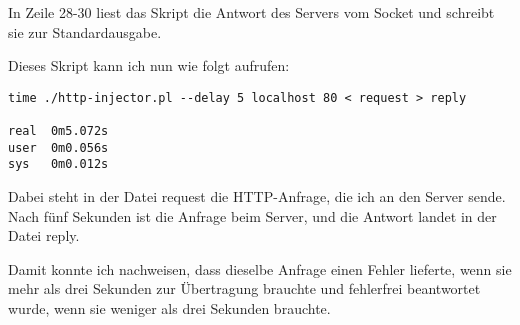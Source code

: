 \begin{normaltext}
  In Zeile 28-30 liest das Skript die Antwort des Servers vom Socket und
  schreibt sie zur Standardausgabe.

  Dieses Skript kann ich nun wie folgt aufrufen:
  \begin{verbatim}
time ./http-injector.pl --delay 5 localhost 80 < request > reply

real  0m5.072s
user  0m0.056s
sys   0m0.012s
  \end{verbatim}
  Dabei steht in der Datei request die HTTP-Anfrage, die ich an den Server
  sende.
  Nach fünf Sekunden ist die Anfrage beim Server, und die Antwort landet in
  der Datei reply.

  Damit konnte ich nachweisen, dass dieselbe Anfrage einen Fehler
  lieferte, wenn sie mehr als drei Sekunden zur Übertragung brauchte und
  fehlerfrei beantwortet wurde, wenn sie weniger als drei Sekunden brauchte.
\end{normaltext}

